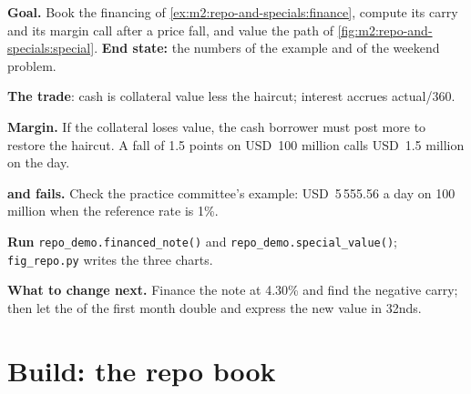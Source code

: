 \begin{tutorial}
\textbf{Goal.} Book the financing of \cref{ex:m2:repo-and-specials:finance},
compute its carry and its margin call after a price fall, and value the
 path of \cref{fig:m2:repo-and-specials:special}. \textbf{End
state:} the numbers of the example and of the weekend problem.
\begin{tutsteps}
\item \textbf{The trade}: cash is collateral value less the haircut; interest
accrues actual/360.
\label{lst:m2:repo-and-specials:trade}
\item \textbf{Margin.} If the collateral loses value, the cash borrower must
post more to restore the haircut.
\label{lst:m2:repo-and-specials:margin}
A fall of 1.5 points on USD~100 million calls USD~1.5 million on the day.
\item \textbf{ and fails.}
\label{lst:m2:repo-and-specials:special}
Check the practice committee's example: USD~5\,555.56 a day on 100 million
when the reference rate is 1\%.
\item \textbf{Run} \texttt{repo\_demo.financed\_note()} and
\texttt{repo\_demo.special\_value()}; \texttt{fig\_repo.py} writes the three
charts.
\end{tutsteps}
\textbf{What to change next.} Finance the note at 4.30\% and find the
negative carry; then let the  of the first month double and
express the new value in 32nds.
\end{tutorial}

\section{Build: the repo book}\label{bld:m2:repo-and-specials:book}


